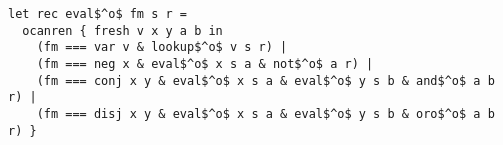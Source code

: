 \begin{lstlisting}
let rec eval$^o$ fm s r =
  ocanren { fresh v x y a b in
    (fm === var v & lookup$^o$ v s r) |
    (fm === neg x & eval$^o$ x s a & not$^o$ a r) |
    (fm === conj x y & eval$^o$ x s a & eval$^o$ y s b & and$^o$ a b r) |
    (fm === disj x y & eval$^o$ x s a & eval$^o$ y s b & oro$^o$ a b r) }
  \end{lstlisting}